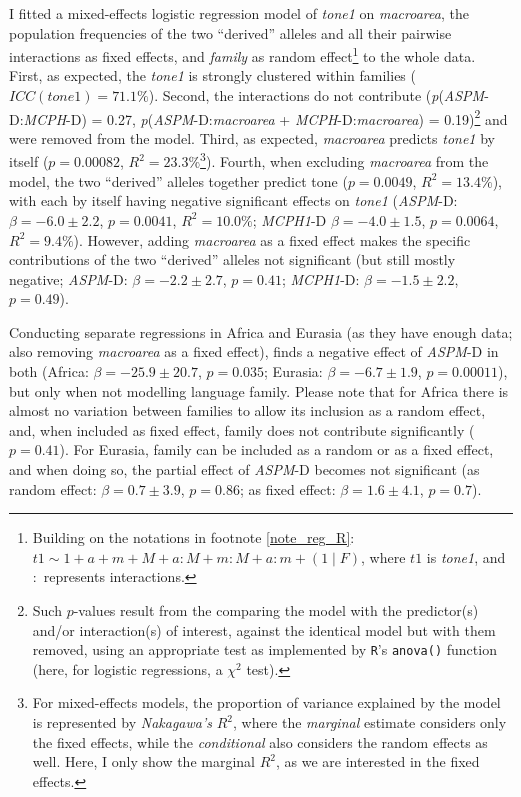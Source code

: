 \documentclass[twoside,onecolumn]{article}
\begin{document}
I fitted a mixed-effects logistic regression model of \textit{tone1} on \textit{macroarea}, the population frequencies of the two ``derived'' alleles and all their pairwise interactions as fixed effects, and \textit{family} as random effect\footnote{Building on the notations in footnote \ref{note_reg_R}: $t1 \sim 1 + a + m +  M + a:M + m:M + a:m + (1 \mid F)$, where $t1$ is \textit{tone1}, and $:$ represents interactions.} to the whole data.
First, as expected, the \textit{tone1} is strongly clustered within families ($ICC(tone1) = 71.1\%$).
Second, the interactions do not contribute (\textit{p}(\textit{ASPM}-D:\textit{MCPH}-D) = 0.27, \textit{p}(\textit{ASPM}-D:\textit{macroarea} + \textit{MCPH}-D:\textit{macroarea}) = 0.19)\footnote{Such $p$-values result from the comparing the model with the predictor(s) and/or interaction(s) of interest, against the identical model but with them removed, using an appropriate test as implemented by \texttt{R}'s \texttt{anova()} function (here, for logistic regressions, a $\chi^2$ test).} and were removed from the model.
Third, as expected, \textit{macroarea} predicts \textit{tone1} by itself ($p = 0.00082$, $R^2 = 23.3\%$\footnote{For mixed-effects models, the proportion of variance explained by the model is represented by \emph{Nakagawa's} $R^2$, where the \emph{marginal} estimate considers only the fixed effects, while the \emph{conditional} also considers the random effects as well. Here, I only show the marginal $R^2$, as we are interested in the fixed effects.}).
Fourth, when excluding \textit{macroarea} from the model, the two ``derived'' alleles together predict tone ($p = 0.0049$, $R^2 = 13.4\%$), with each by itself having negative significant effects on \textit{tone1} (\textit{ASPM}-D: $\beta = -6.0 \pm 2.2$, $p = 0.0041$, $R^2 = 10.0\%$; \textit{MCPH1}-D $\beta = -4.0 \pm 1.5$, $p = 0.0064$, $R^2 = 9.4\%$).
However, adding \textit{macroarea} as a fixed effect makes the specific contributions of the two ``derived'' alleles not significant (but still mostly negative;  \textit{ASPM}-D: $\beta = -2.2 \pm 2.7$, $p = 0.41$; \textit{MCPH1}-D: $\beta = -1.5 \pm 2.2$, $p = 0.49$).

Conducting separate regressions in Africa and Eurasia (as they have enough data; also removing \textit{macroarea} as a fixed effect), finds a negative effect of \textit{ASPM}-D in both (Africa: $\beta = -25.9 \pm 20.7$, $p = 0.035$; Eurasia: $\beta = -6.7 \pm 1.9$, $p = 0.00011$), but only when not modelling language family.
Please note that for Africa there is almost no variation between families to allow its inclusion as a random effect, and, when included as fixed effect, family does not contribute significantly ($p = 0.41$).
For Eurasia, family can be included as a random or as a fixed effect, and when doing so, the partial effect of \textit{ASPM}-D becomes not significant (as random effect: $\beta = 0.7 \pm 3.9$, $p = 0.86$; as fixed effect: $\beta = 1.6 \pm 4.1$, $p = 0.7$).
\end{document}
